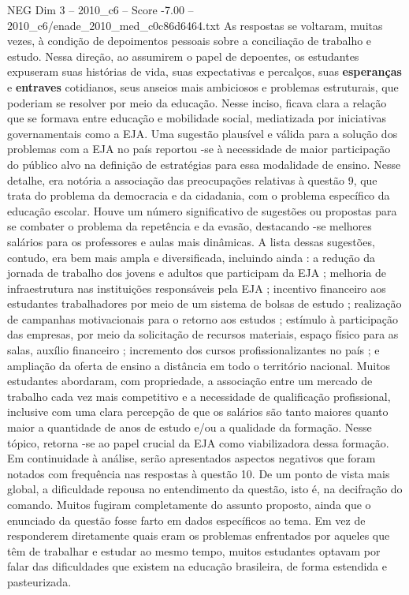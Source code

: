 \begin{textsample}{NEG Dim 3 – 2010\_c6 – Score -7.00 – 2010\_c6/enade\_2010\_med\_c0c86d6464.txt}
As respostas se voltaram, muitas vezes, à condição de depoimentos pessoais sobre a conciliação de trabalho e estudo.
Nessa direção, ao assumirem o papel de depoentes, os estudantes expuseram suas histórias de vida, suas expectativas e percalços, suas \textbf{esperanças} e \textbf{entraves} cotidianos, seus anseios mais ambiciosos e problemas estruturais, que poderiam se resolver por meio da educação.
Nesse inciso, ficava clara a relação que se formava entre educação e mobilidade social, mediatizada por iniciativas governamentais como a EJA.
Uma sugestão plausível e válida para a solução dos problemas com a EJA no país reportou -se à necessidade de maior participação do público alvo na definição de estratégias para essa modalidade de ensino.
Nesse detalhe, era notória a associação das preocupações relativas à questão 9, que trata do problema da democracia e da cidadania, com o problema específico da educação escolar.
Houve um número significativo de sugestões ou propostas para se combater o problema da repetência e da evasão, destacando -se melhores salários para os professores e aulas mais dinâmicas.
A lista dessas sugestões, contudo, era bem mais ampla e diversificada, incluindo ainda : a redução da jornada de trabalho dos jovens e adultos que participam da EJA ; melhoria de infraestrutura nas instituições responsáveis pela EJA ; incentivo financeiro aos estudantes trabalhadores por meio de um sistema de bolsas de estudo ; realização de campanhas motivacionais para o retorno aos estudos ; estímulo à participação das empresas, por meio da solicitação de recursos materiais, espaço físico para as salas, auxílio financeiro ; incremento dos cursos profissionalizantes no país ; e ampliação da oferta de ensino a distância em todo o território nacional.
Muitos estudantes abordaram, com propriedade, a associação entre um mercado de trabalho cada vez mais competitivo e a necessidade de qualificação profissional, inclusive com uma clara percepção de que os salários são tanto maiores quanto maior a quantidade de anos de estudo e/ou a qualidade da formação.
Nesse tópico, retorna -se ao papel crucial da EJA como viabilizadora dessa formação.
Em continuidade à análise, serão apresentados aspectos negativos que foram notados com frequência nas respostas à questão 10.
De um ponto de vista mais global, a dificuldade repousa no entendimento da questão, isto é, na decifração do comando.
Muitos fugiram completamente do assunto proposto, ainda que o enunciado da questão fosse farto em dados específicos ao tema.
Em vez de responderem diretamente quais eram os problemas enfrentados por aqueles que têm de trabalhar e estudar ao mesmo tempo, muitos estudantes optavam por falar das dificuldades que existem na educação brasileira, de forma estendida e pasteurizada.

\end{textsample}

